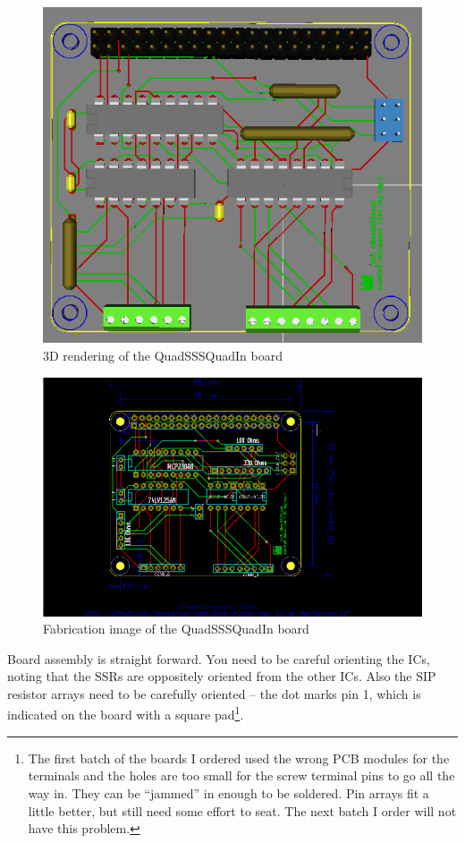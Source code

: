 \begin{figure}[hbpt]\begin{centering}%
\includegraphics[width=5in]{QuadSSSQuadIn3DTop.png}
\caption{3D rendering of the QuadSSSQuadIn board}
\end{centering}\end{figure}
\begin{figure}[hbpt]\begin{centering}%
\includegraphics[width=5in]{QuadSSSQuadIn.png}
\caption{Fabrication image of the QuadSSSQuadIn board}
\end{centering}\end{figure}
Board assembly is straight forward.  You need to be careful orienting the ICs, 
noting that the SSRs are oppositely oriented from the other ICs.  Also the 
SIP resistor arrays need to be carefully oriented -- the dot marks pin 1, 
which is indicated on the board with a square pad\footnote{The first batch of 
the boards I ordered used the wrong PCB modules for the terminals and the 
holes are too small for the screw terminal pins to go all the way in.  They 
can be ``jammed'' in enough to be soldered. Pin arrays fit a little better, 
but still need some effort to seat.  The next batch I order will not have this 
problem.}. 

